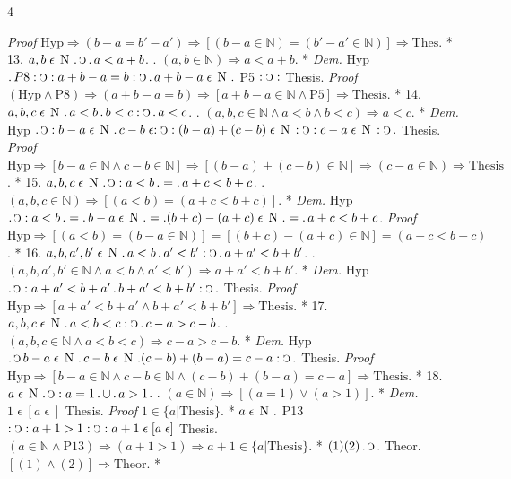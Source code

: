 \documentclass{book}
\newcommand{\s}{\switchcolumn} %
\newcommand{\C}{\mathop{\sbox0{$\displaystyle$$\reflectbox{C}$} %
\raisebox{-\height+\ht0-0.05cm}[\ht0][\dp0]{\scalebox{0.8}[0.8]{\copy0}}}\displaylimits} %
\newcommand{\p}{\mathop{\sbox0{$\displaystyle$$.$}
\raisebox{-\height+\ht0}[\ht0][\dp0]{\scalebox{1}[1]{\copy0}}}\displaylimits} %
\newcommand{\smallIn}{\ensuremath{\mathrel{\epsilon}}}
\newcommand{\N}{\mathop{\thinspace \text{N} \thinspace}}
\renewcommand{\rightarrow}{\Rightarrow}
\newenvironment{translateFourCol}[4]
               { %
                 \setcolumnwidth{#1\fill/1em, #2\fill/\columnsep, #3\fill/1em, #4\fill}
                 \begin{paracol}{4}
                 \newcommand{\LAT}{\switchcolumn[0]*}
                 \newcommand{\ENG}{\switchcolumn[2]}
               }
               { %
                 \let\ENG\undefined
                 \let\LAT\undefined
                 \end{paracol}
               }
\begin{document}
\begin{translateFourCol}{0.08}{0.42}{0.08}{0.42}
\ENG
\emph{Proof} \s $\text{Hyp} \rightarrow (b - a = b' - a') \rightarrow [(b - a \in \mathbb{N}) = (b' - a' \in \mathbb{N})] \rightarrow \text{Thes}$.
\LAT
13. \s $a,b \smallIn \N \p \C \p a < a + b$.
\ENG
13. \s $(a,b \in \mathbb{N}) \rightarrow a < a + b$.
\LAT
\emph{Dem.} \s Hyp $\p P8 : \C : a + b - a = b : \C \p a + b - a \smallIn \N \p$ P5 $: \C :$ Thesis.
\ENG
\emph{Proof} \s $(\text{Hyp} \wedge \text{P8}) \rightarrow (a + b - a = b) \rightarrow [a + b - a \in \mathbb{N} \wedge \text{P5}] \rightarrow \text{Thesis}$.
\LAT
14. \s $a,b,c \smallIn \N \p a < b \p b < c : \C \p a < c$.
\ENG
14. \s $(a,b,c \in \mathbb{N} \wedge a < b \wedge b < c) \rightarrow a < c$.
\LAT
\emph{Dem.} \s Hyp $\p \C : b - a \smallIn \N \p c - b \smallIn : \C : (b - a) + (c - b) \smallIn \N : \C : c - a \smallIn \N : \C \p$ Thesis.
\ENG
\emph{Proof} \s $\text{Hyp} \rightarrow [b - a \in \mathbb{N} \wedge c - b \in \mathbb{N}] \rightarrow [(b - a) + (c - b) \in \mathbb{N}] \rightarrow (c - a \in \mathbb{N}) \rightarrow \text{Thesis}$.
\LAT
15. \s $a,b,c \smallIn \N \p \C : a < b \p = \p a + c < b + c$.
\ENG
15. \s $(a,b,c \in \mathbb{N}) \rightarrow [(a < b) = (a + c < b + c)]$.
\LAT
\emph{Dem.} \s Hyp $\p \C : a < b \p = \p b - a \smallIn \N \p = \p (b + c) - (a + c) \smallIn \N \p = \p a + c < b + c$.
\ENG
\emph{Proof} \s $\text{Hyp} \rightarrow [(a < b) = (b - a \in \mathbb{N})] = [(b + c) - (a + c) \in \mathbb{N}] = (a + c < b + c)$.
\LAT
16. \s $a,b,a',b' \smallIn \N \p a < b \p a' < b' : \C \p a + a' < b + b'$.
\ENG
16. \s $(a,b,a',b' \in \mathbb{N} \wedge a < b \wedge a' < b') \rightarrow a + a' < b + b'$.
\LAT
\emph{Dem.} \s Hyp $\p \C : a + a' < b + a' \p b + a' < b + b' : \C \p$ Thesis.
\ENG
\emph{Proof} \s $\text{Hyp} \rightarrow [a + a' < b + a' \wedge b + a' < b + b'] \rightarrow \text{Thesis}$.
\LAT
17. \s $a,b,c \smallIn \N \p a < b < c : \C \p c - a > c - b$.
\ENG
17. \s $(a,b,c \in \mathbb{N} \wedge a < b < c) \rightarrow c - a > c - b$.
\LAT
\emph{Dem.} \s Hyp $\p \C b - a \smallIn \N \p c - b \smallIn \N \p (c - b) + (b - a) = c - a : \C \p$ Thesis.
\ENG
\emph{Proof} \s $\text{Hyp} \rightarrow [b - a \in \mathbb{N} \wedge c - b \in \mathbb{N} \wedge (c - b) + (b - a) = c - a] \rightarrow \text{Thesis}$.
\LAT
18. \s $a \smallIn \N \p \C : a = 1 \p \cup \p a > 1$.
\ENG
18. \s $(a \in \mathbb{N}) \rightarrow [(a = 1) \vee (a > 1)]$.
\LAT
\emph{Dem.} \s $1 \smallIn [a \smallIn]$ Thesis.
\ENG
\emph{Proof} \s $1 \in \{ a | \text{Thesis} \}$.
\LAT
\s $a \smallIn \N \p$ P13 $: \C : a + 1 > 1 : \C : a + 1 \smallIn [a \smallIn]$ Thesis.
\ENG
\s $(a \in \mathbb{N} \wedge \text{P13}) \rightarrow (a + 1 > 1) \rightarrow a + 1 \in \{ a | \text{Thesis} \}$.
\LAT
\s $(1)(2) \p \C \p$ Theor.
\ENG
\s $[(1) \wedge (2)] \rightarrow \text{Theor}$.
\LAT
\end{translateFourCol}
\end{document}
